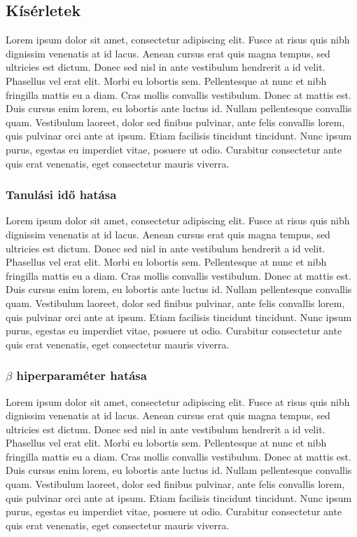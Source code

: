 \documentclass[12pt]{article}
\begin{document}
\subsection{Kísérletek}

Lorem ipsum dolor sit amet, consectetur adipiscing elit. Fusce at risus quis nibh dignissim venenatis at id lacus. Aenean cursus erat quis magna tempus, sed ultricies est dictum. Donec sed nisl in ante vestibulum hendrerit a id velit. Phasellus vel erat elit. Morbi eu lobortis sem. Pellentesque at nunc et nibh fringilla mattis eu a diam. Cras mollis convallis vestibulum. Donec at mattis est. Duis cursus enim lorem, eu lobortis ante luctus id. Nullam pellentesque convallis quam. Vestibulum laoreet, dolor sed finibus pulvinar, ante felis convallis lorem, quis pulvinar orci ante at ipsum. Etiam facilisis tincidunt tincidunt. Nunc ipsum purus, egestas eu imperdiet vitae, posuere ut odio. Curabitur consectetur ante quis erat venenatis, eget consectetur mauris viverra.

\subsubsection{Tanulási idő hatása}

Lorem ipsum dolor sit amet, consectetur adipiscing elit. Fusce at risus quis nibh dignissim venenatis at id lacus. Aenean cursus erat quis magna tempus, sed ultricies est dictum. Donec sed nisl in ante vestibulum hendrerit a id velit. Phasellus vel erat elit. Morbi eu lobortis sem. Pellentesque at nunc et nibh fringilla mattis eu a diam. Cras mollis convallis vestibulum. Donec at mattis est. Duis cursus enim lorem, eu lobortis ante luctus id. Nullam pellentesque convallis quam. Vestibulum laoreet, dolor sed finibus pulvinar, ante felis convallis lorem, quis pulvinar orci ante at ipsum. Etiam facilisis tincidunt tincidunt. Nunc ipsum purus, egestas eu imperdiet vitae, posuere ut odio. Curabitur consectetur ante quis erat venenatis, eget consectetur mauris viverra.

\subsubsection{$\beta$ hiperparaméter hatása}

Lorem ipsum dolor sit amet, consectetur adipiscing elit. Fusce at risus quis nibh dignissim venenatis at id lacus. Aenean cursus erat quis magna tempus, sed ultricies est dictum. Donec sed nisl in ante vestibulum hendrerit a id velit. Phasellus vel erat elit. Morbi eu lobortis sem. Pellentesque at nunc et nibh fringilla mattis eu a diam. Cras mollis convallis vestibulum. Donec at mattis est. Duis cursus enim lorem, eu lobortis ante luctus id. Nullam pellentesque convallis quam. Vestibulum laoreet, dolor sed finibus pulvinar, ante felis convallis lorem, quis pulvinar orci ante at ipsum. Etiam facilisis tincidunt tincidunt. Nunc ipsum purus, egestas eu imperdiet vitae, posuere ut odio. Curabitur consectetur ante quis erat venenatis, eget consectetur mauris viverra.
\end{document}
